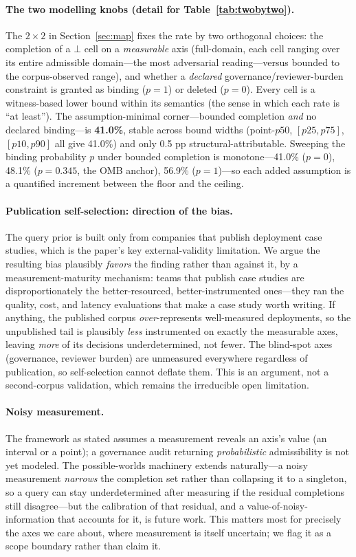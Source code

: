 \documentclass{article} %
\newcommand{\bbot}{\bot}
\begin{document}
\paragraph{The two modelling knobs (detail for Table~\ref{tab:twobytwo}).}
The $2\times2$ in Section~\ref{sec:map} fixes the rate by two orthogonal choices: the completion of a $\bbot$ cell on a \emph{measurable} axis (full-domain, each cell ranging over its entire admissible domain---the most adversarial reading---versus bounded to the corpus-observed range), and whether a \emph{declared} governance/reviewer-burden constraint is granted as binding ($p{=}1$) or deleted ($p{=}0$). Every cell is a witness-based lower bound within its semantics (the sense in which each rate is ``at least''). The assumption-minimal corner---bounded completion \emph{and} no declared binding---is \textbf{41.0\%}, stable across bound widths (point-$p50$, $[p25,p75]$, $[p10,p90]$ all give 41.0\%) and only 0.5 pp structural-attributable. Sweeping the binding probability $p$ under bounded completion is monotone---41.0\% ($p{=}0$), 48.1\% ($p{=}0.345$, the OMB anchor), 56.9\% ($p{=}1$)---so each added assumption is a quantified increment between the floor and the ceiling.

\paragraph{Publication self-selection: direction of the bias.}
The query prior is built only from companies that publish deployment case studies, which is the paper's key external-validity limitation. We argue the resulting bias plausibly \emph{favors} the finding rather than against it, by a measurement-maturity mechanism: teams that publish case studies are disproportionately the better-resourced, better-instrumented ones---they ran the quality, cost, and latency evaluations that make a case study worth writing. If anything, the published corpus \emph{over}-represents well-measured deployments, so the unpublished tail is plausibly \emph{less} instrumented on exactly the measurable axes, leaving \emph{more} of its decisions underdetermined, not fewer. The blind-spot axes (governance, reviewer burden) are unmeasured everywhere regardless of publication, so self-selection cannot deflate them. This is an argument, not a second-corpus validation, which remains the irreducible open limitation.

\paragraph{Noisy measurement.}
The framework as stated assumes a measurement reveals an axis's value (an interval or a point); a governance audit returning \emph{probabilistic} admissibility is not yet modeled. The possible-worlds machinery extends naturally---a noisy measurement \emph{narrows} the completion set rather than collapsing it to a singleton, so a query can stay underdetermined after measuring if the residual completions still disagree---but the calibration of that residual, and a value-of-noisy-information that accounts for it, is future work. This matters most for precisely the axes we care about, where measurement is itself uncertain; we flag it as a scope boundary rather than claim it.
\end{document}
